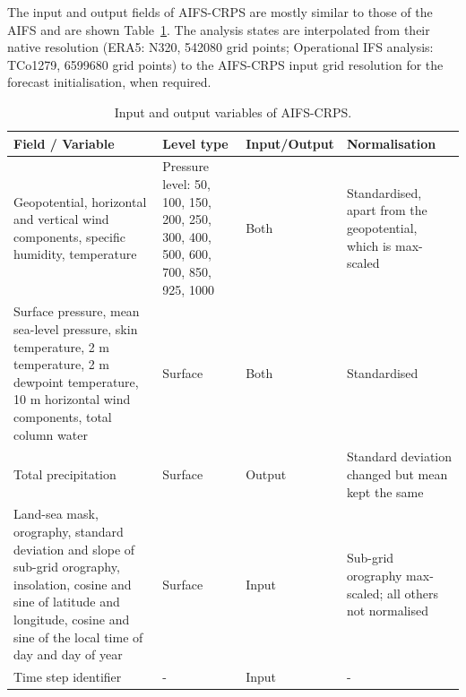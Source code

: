 \documentclass{article}
\begin{document}
The input and output fields of AIFS-CRPS are mostly similar to those of the AIFS and are shown Table~\ref{table:variables}. 
The analysis states are interpolated from their native resolution (ERA5: N320, \num{542080} grid points; Operational IFS analysis: TCo1279, \num{6599680} grid points) to the AIFS-CRPS input grid resolution for the forecast initialisation, when required. 
\begin{table}[htbp]
\centering
\begin{tabular}{|p{5cm}|p{3cm}|p{3cm}|p{3cm}|}
\hline
\textbf{Field / Variable} & \textbf{Level type} & \textbf{Input/Output} & \textbf{Normalisation} \\ 
\hline
Geopotential, horizontal and vertical wind components, specific humidity, temperature & Pressure level: 50, 100, 150, 200, 250, 300, 400, 500, 600, 700, 850, 925, 1000 & Both & {Standardised, apart from the geopotential, which is max-scaled} \\ 
\hline
Surface pressure, mean sea-level pressure, skin temperature, 2 m temperature, 2 m dewpoint temperature, 10 m horizontal wind components, total column water & Surface & Both & {Standardised} \\ 
\hline
Total precipitation & Surface & Output & {Standard deviation changed but mean kept the same}\\ 
\hline
Land-sea mask, orography, standard deviation and slope of sub-grid orography,  insolation, cosine and sine of latitude and longitude, cosine and sine of the local time of day and day of year & Surface & Input & {Sub-grid orography max-scaled; all others not normalised} \\
\hline
Time step identifier & - & Input & -\\
\hline
\end{tabular}
\caption{Input and output variables of AIFS-CRPS.}
\label{table:variables}
\end{table}
\end{document}
